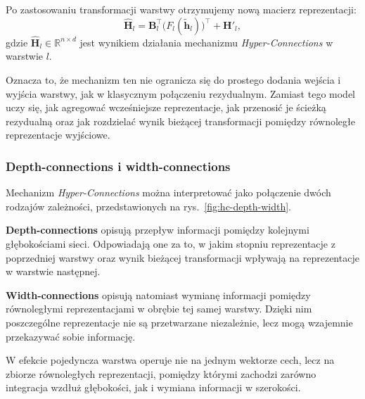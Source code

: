 Po zastosowaniu transformacji warstwy otrzymujemy nową macierz reprezentacji:
\begin{equation}
	\hat{\mathbf{H}}_l =
	\mathbf{B}_l^{\top}\bigl(F_l(\tilde{\mathbf{h}}_l)\bigr)^{\top}
	+ \mathbf{H}'_l,
\end{equation}
gdzie \(\hat{\mathbf{H}}_l \in \mathbb{R}^{n \times d}\) jest wynikiem działania
mechanizmu \textit{Hyper-Connections} w warstwie \(l\).

Oznacza to, że mechanizm ten nie ogranicza się do prostego dodania wejścia i wyjścia
warstwy, jak w klasycznym połączeniu rezydualnym. Zamiast tego model uczy się, jak
agregować wcześniejsze reprezentacje, jak przenosić je ścieżką rezydualną oraz jak
rozdzielać wynik bieżącej transformacji pomiędzy równoległe reprezentacje wyjściowe.

\subsubsection*{Depth-connections i width-connections}

Mechanizm \textit{Hyper-Connections} można interpretować jako połączenie dwóch rodzajów
zależności, przedstawionych na rys.~\ref{fig:hc-depth-width}.

\textbf{Depth-connections} opisują przepływ informacji pomiędzy kolejnymi głębokościami
sieci. Odpowiadają one za to, w jakim stopniu reprezentacje z poprzedniej warstwy oraz
wynik bieżącej transformacji wpływają na reprezentacje w warstwie następnej.

\textbf{Width-connections} opisują natomiast wymianę informacji pomiędzy równoległymi
reprezentacjami w obrębie tej samej warstwy. Dzięki nim poszczególne reprezentacje
nie są przetwarzane niezależnie, lecz mogą wzajemnie przekazywać sobie informację.

W efekcie pojedyncza warstwa operuje nie na jednym wektorze cech, lecz na zbiorze
równoległych reprezentacji, pomiędzy którymi zachodzi zarówno integracja wzdłuż
głębokości, jak i wymiana informacji w szerokości.


